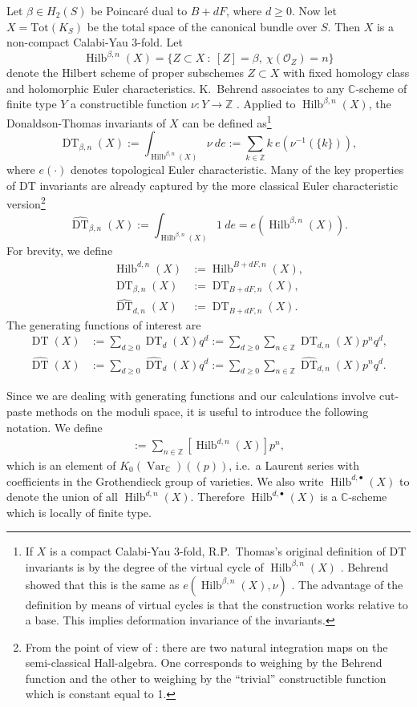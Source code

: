 \documentclass{amsart}
\theoremstyle{definition}
\newcommand{\CC} {\mathbb{C}}          %
\newcommand{\ZZ} {\mathbb{Z}}		%
\renewcommand{\O}{\mathcal{O}}
\newcommand{\Hilb}{\operatorname{Hilb}}
\newcommand{\DT}{\operatorname{DT}}
\newcommand{\Var}{\operatorname{Var}}
\begin{document}
Let $\beta \in H_2(S)$ be Poincar\'e dual to $B+dF$, where $d \geq 0$. 
Now let $X = \mathrm{Tot}(K_S)$ be the total space of the canonical bundle over $S$. Then $X$ is a non-compact Calabi-Yau 3-fold. Let
$$
\Hilb^{\beta,n}(X) = \{ Z \subset X \ : \ [Z] = \beta, \ \chi(\O_Z) = n\}
$$
denote the Hilbert scheme of proper subschemes $Z \subset X$ with fixed homology class and holomorphic Euler characteristics. K.~Behrend associates to any $\CC$-scheme of finite type $Y$ a constructible function $\nu : Y \rightarrow \ZZ$ \cite{Beh}. Applied to $\Hilb^{\beta,n}(X)$, the Donaldson-Thomas invariants of $X$ can be defined as\footnote{If $X$ is a compact Calabi-Yau 3-fold, R.P.~Thomas's original definition of DT invariants is by the degree of the virtual cycle of $\Hilb^{\beta,n}(X)$ \cite{Tho}. Behrend showed that this is the same as $e(\Hilb^{\beta,n}(X),\nu)$ \cite{Beh}. The advantage of the definition by means of virtual cycles is that the construction works relative to a base. This implies deformation invariance of the invariants.} 
$$
\DT_{\beta,n}(X) := \int_{\Hilb^{\beta,n}(X)} \nu \ de := \sum_{k \in \ZZ} k \ e(\nu^{-1}(\{k\})),
$$
where $e(\cdot)$ denotes topological Euler characteristic. Many of the key properties of DT invariants are already captured by the more classical Euler characteristic version\footnote{From the point of view of \cite{Joy, Bri}: there are two natural integration maps on the semi-classical Hall-algebra. One corresponds to weighing by the Behrend function and the other to weighing by the ``trivial'' constructible function which is constant equal to 1.}
$$
\widehat{\DT}_{\beta,n}(X) := \int_{\Hilb^{\beta,n}(X)} 1 \ de = e(\Hilb^{\beta,n}(X)).
$$
For brevity, we define
\begin{align*}
\Hilb^{d,n}(X) &:=\Hilb^{B+dF,n}(X), \\
\DT_{\beta,n}(X) &:= \DT_{B+dF,n}(X), \\
\widehat{\DT}_{d,n}(X) &:= \DT_{B+dF,n}(X).
\end{align*}
The generating functions of interest are
\begin{align*}
\DT(X) &:= \sum_{d \geq 0} \DT_d(X) q^d := \sum_{d \geq 0} \sum_{n \in \ZZ} \DT_{d,n}(X) p^n q^d, \\
\widehat{\DT}(X) &:= \sum_{d \geq 0} \widehat{\DT}_d(X) q^d := \sum_{d \geq 0} \sum_{n \in \ZZ} \widehat{\DT}_{d,n}(X) p^n q^d.
\end{align*}

Since we are dealing with generating functions and our calculations involve cut-paste methods on the moduli space, it is useful to introduce the following notation. We define
\begin{align*}
[\Hilb^{d,\bullet}(X)] := \sum_{n \in \ZZ} [\Hilb^{d,n}(X)] p^n,
\end{align*}
which is an element of $K_0(\Var_{\CC})(\!(p)\!)$, i.e.~a Laurent series with coefficients in the Grothendieck group of varieties. We also write $\Hilb^{d,\bullet}(X)$ to denote the union of all $\Hilb^{d,n}(X)$. Therefore $\Hilb^{d,\bullet}(X)$ is a $\CC$-scheme which is locally of finite type.
\end{document}
